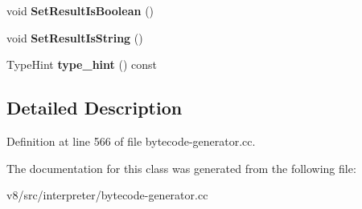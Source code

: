 \begin{DoxyCompactItemize}
void {\bfseries Set\+Result\+Is\+Boolean} ()
\item 
\mbox{\label{classv8_1_1internal_1_1interpreter_1_1BytecodeGenerator_1_1ExpressionResultScope_af2cf321187eb341e8a97c5a7cd9a10d4}} 
void {\bfseries Set\+Result\+Is\+String} ()
\item 
\mbox{\label{classv8_1_1internal_1_1interpreter_1_1BytecodeGenerator_1_1ExpressionResultScope_a82bbb9c8a6e673611fdd27e1b736b6c7}} 
Type\+Hint {\bfseries type\+\_\+hint} () const
\end{DoxyCompactItemize}


\subsection{Detailed Description}


Definition at line 566 of file bytecode-\/generator.\+cc.



The documentation for this class was generated from the following file\+:\begin{DoxyCompactItemize}
\item 
v8/src/interpreter/bytecode-\/generator.\+cc\end{DoxyCompactItemize}
